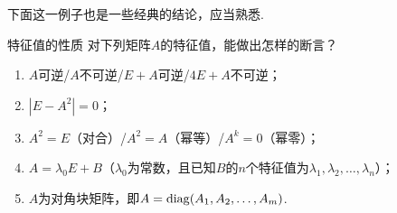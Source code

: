 下面这一例子也是一些经典的结论，应当熟悉.
\begin{example}{}{特征值的性质}
    对下列矩阵$A$的特征值，能做出怎样的断言？
    \begin{enumerate}
        \item $A$可逆/$A$不可逆/$E+A$可逆/$4E+A$不可逆；

        \item $|E - A^2| = 0$；

        \item $A^2 = E$（对合）/$A^2 = A$（幂等）/$A^k = 0$（幂零）；

        \item $A=\lambda_0E+B$（$\lambda_0$为常数，且已知$B$的$n$个特征值为$\lambda_1,\lambda_2,\ldots,\lambda_n$）；

        \item $A$为对角块矩阵，即$A=\operatorname{diag}(A_1,A_2,\ldots,A_m)$.
    \end{enumerate}
\end{example}


